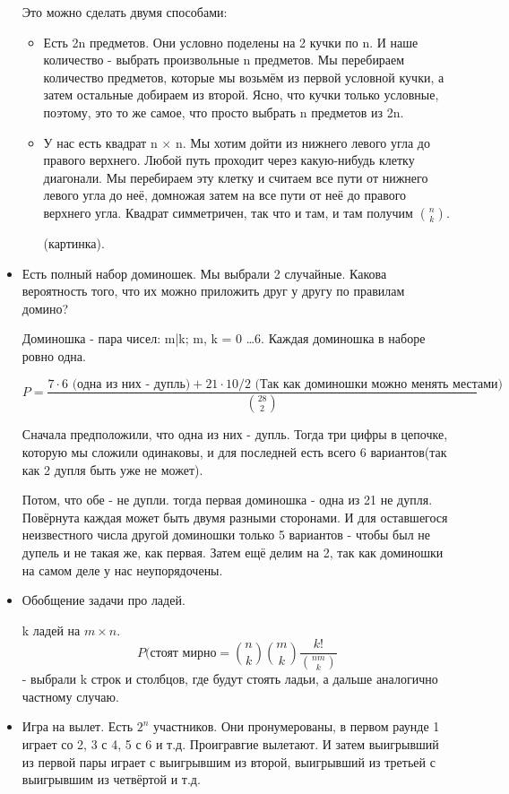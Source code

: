 \begin{itemize}
	Это можно сделать двумя способами:
	\begin{itemize}
		\item Есть 2n предметов. Они условно поделены на 2 кучки по n. И наше количество - выбрать произвольные n предметов. Мы перебираем количество предметов, которые мы возьмём из первой условной кучки, а затем остальные добираем из второй. Ясно, что кучки только условные, поэтому, это то же самое, что просто выбрать n предметов из 2n.
		\item  У нас есть квадрат n $\times$ n. Мы хотим дойти из нижнего левого угла до правого верхнего. Любой путь проходит через какую-нибудь клетку диагонали. Мы перебираем эту клетку и считаем все пути от нижнего левого угла до неё, домножая затем на все пути от неё до правого верхнего угла. Квадрат симметричен, так что и там, и там получим $\binom{n}{k}$.
		
		(картинка).
	\end{itemize}
	\item Есть полный набор доминошек. Мы выбрали 2 случайные. Какова вероятность того, что их можно приложить друг у другу по правилам домино?
	
	Доминошка - пара чисел: m|k; m, k = 0 \dots 6. Каждая доминошка в наборе ровно одна.
	
	\[P = \frac{7\cdot6 \text{ (одна из них - дупль)} + 21\cdot 10/2 \text{ (Так как доминошки можно менять местами)}}{\binom{28}{2}}\] 
	
	Сначала предположили, что одна из них - дупль. Тогда три цифры в цепочке, которую мы сложили одинаковы, и для последней есть всего 6 вариантов(так как 2 дупля быть уже не может).
	
	Потом, что обе - не дупли. тогда первая доминошка - одна из 21 не дупля. Повёрнута каждая может быть двумя разными сторонами. И для оставшегося неизвестного числа другой доминошки только 5 вариантов - чтобы был не дупель и не такая же, как первая. Затем ещё делим на 2, так как доминошки на самом деле у нас неупорядочены.
	
	\item Обобщение задачи про ладей.
	
	k ладей на $m \times n$. 
	\[P(\text{стоят мирно} = \binom{n}{k} \binom{m}{k} \frac{k!}{\binom{nm}{k}}\] - выбрали k строк и столбцов, где будут стоять ладьи, а дальше аналогично частному случаю.
	
	\item Игра на вылет. Есть $2^n$ участников. Они пронумерованы, в первом раунде 1 играет со 2, 3 с 4, 5 с 6 и т.д. Проигравгие вылетают. И затем выигрывший из первой пары играет с выигрывшим из второй, выигрывший из третьей с выигрывшим из четвёртой и т.д. 
	

\end{itemize}
